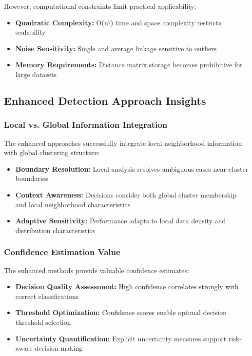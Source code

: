 However, computational constraints limit practical applicability:
\begin{itemize}
\item \textbf{Quadratic Complexity:} O(n²) time and space complexity restricts scalability
\item \textbf{Noise Sensitivity:} Single and average linkage sensitive to outliers
\item \textbf{Memory Requirements:} Distance matrix storage becomes prohibitive for large datasets
\end{itemize}

\subsection{Enhanced Detection Approach Insights}

\subsubsection{Local vs. Global Information Integration}
The enhanced approaches successfully integrate local neighborhood information with global clustering structure:
\begin{itemize}
\item \textbf{Boundary Resolution:} Local analysis resolves ambiguous cases near cluster boundaries
\item \textbf{Context Awareness:} Decisions consider both global cluster membership and local neighborhood characteristics
\item \textbf{Adaptive Sensitivity:} Performance adapts to local data density and distribution characteristics
\end{itemize}

\subsubsection{Confidence Estimation Value}
The enhanced methods provide valuable confidence estimates:
\begin{itemize}
\item \textbf{Decision Quality Assessment:} High confidence correlates strongly with correct classifications
\item \textbf{Threshold Optimization:} Confidence scores enable optimal decision threshold selection
\item \textbf{Uncertainty Quantification:} Explicit uncertainty measures support risk-aware decision making
\end{itemize}

